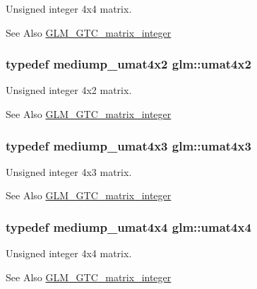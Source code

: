 Unsigned integer 4x4 matrix. \begin{DoxySeeAlso}{See Also}
\hyperlink{group__gtc__matrix__integer}{G\-L\-M\-\_\-\-G\-T\-C\-\_\-matrix\-\_\-integer} 
\end{DoxySeeAlso}
\hypertarget{group__gtc__matrix__integer_ga13e8392218e9b6e1b7f194a21b5c88bf}{
\subsubsection[{umat4x2}]{\setlength{\rightskip}{0pt plus 5cm}typedef mediump\-\_\-umat4x2 {\bf glm\-::umat4x2}}}\label{group__gtc__matrix__integer_ga13e8392218e9b6e1b7f194a21b5c88bf}
Unsigned integer 4x2 matrix. \begin{DoxySeeAlso}{See Also}
\hyperlink{group__gtc__matrix__integer}{G\-L\-M\-\_\-\-G\-T\-C\-\_\-matrix\-\_\-integer} 
\end{DoxySeeAlso}
\hypertarget{group__gtc__matrix__integer_ga08373f5588a54da1a48e5e55c7d51004}{
\subsubsection[{umat4x3}]{\setlength{\rightskip}{0pt plus 5cm}typedef mediump\-\_\-umat4x3 {\bf glm\-::umat4x3}}}\label{group__gtc__matrix__integer_ga08373f5588a54da1a48e5e55c7d51004}
Unsigned integer 4x3 matrix. \begin{DoxySeeAlso}{See Also}
\hyperlink{group__gtc__matrix__integer}{G\-L\-M\-\_\-\-G\-T\-C\-\_\-matrix\-\_\-integer} 
\end{DoxySeeAlso}
\hypertarget{group__gtc__matrix__integer_gae0931b79e808fb0983848778a60eb548}{
\subsubsection[{umat4x4}]{\setlength{\rightskip}{0pt plus 5cm}typedef mediump\-\_\-umat4x4 {\bf glm\-::umat4x4}}}\label{group__gtc__matrix__integer_gae0931b79e808fb0983848778a60eb548}
Unsigned integer 4x4 matrix. \begin{DoxySeeAlso}{See Also}
\hyperlink{group__gtc__matrix__integer}{G\-L\-M\-\_\-\-G\-T\-C\-\_\-matrix\-\_\-integer} 
\end{DoxySeeAlso}
